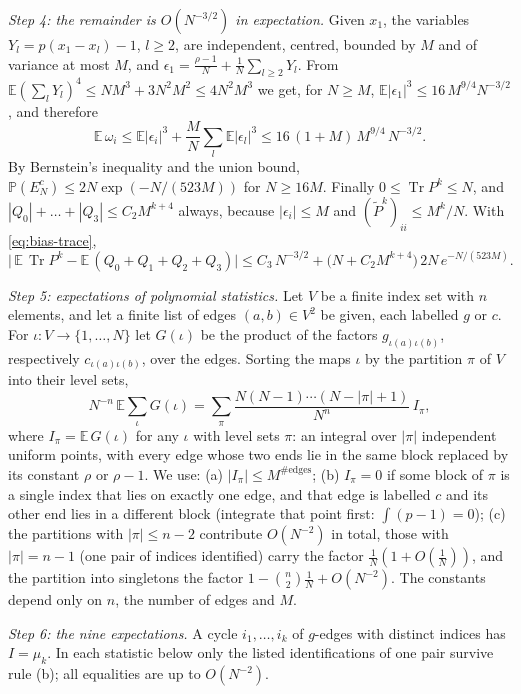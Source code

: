 \documentclass[11pt,a4paper]{article}
\makeatletter
\theoremstyle{stmt}
\theoremstyle{defn}
\theoremstyle{rmk}
\renewenvironment{proof}[1][\proofname]{\par\pushQED{\qed}\normalfont\topsep6\p@\@plus6\p@\relax
  \trivlist\item[\hskip\labelsep{\sffamily\itshape\small #1.}]\ignorespaces}{\popQED\endtrivlist\@endpefalse}
\numberwithin{equation}{section}
\DeclareMathOperator{\Tr}{Tr}
\makeatother
\begin{document}
{\begin{proof}
\emph{Step 4: the remainder is $O(N^{-3/2})$ in expectation.} Given $x_1$, the variables $Y_l=p(x_1-x_l)-1$, $l\ge2$, are independent, centred, bounded by $M$ and of variance at most $M$, and $\epsilon_1=\frac{\rho-1}N+\frac1N\sum_{l\ge2}Y_l$. From $\mathbb E(\sum_lY_l)^4\le NM^3+3N^2M^2\le4N^2M^3$ we get, for $N\ge M$, $\mathbb E|\epsilon_1|^3\le16\,M^{9/4}N^{-3/2}$, and therefore
\[
\mathbb E\,\omega_i\le\mathbb E|\epsilon_i|^3+\frac MN\sum_l\mathbb E|\epsilon_l|^3\le16\,(1+M)\,M^{9/4}\,N^{-3/2}.
\]
By Bernstein's inequality and the union bound, $\mathbb P(E_N^c)\le2N\exp(-N/(523M))$ for $N\ge16M$. Finally $0\le\Tr P^k\le N$, and $|Q_0|+\dots+|Q_3|\le C_2M^{k+4}$ always, because $|\epsilon_i|\le M$ and $(\tilde P^k)_{ii}\le M^k/N$. With \eqref{eq:bias-trace},
\begin{equation}\label{eq:bias-reduce}
\Big|\,\mathbb E\,\Tr P^k-\mathbb E\,(Q_0+Q_1+Q_2+Q_3)\Big|\le C_3\,N^{-3/2}+\big(N+C_2M^{k+4}\big)\,2N\,e^{-N/(523M)} .
\end{equation}

\emph{Step 5: expectations of polynomial statistics.} Let $V$ be a finite index set with $n$ elements, and let a finite list of edges $(a,b)\in V^2$ be given, each labelled $g$ or $c$. For $\iota\colon V\to\{1,\dots,N\}$ let $G(\iota)$ be the product of the factors $g_{\iota(a)\iota(b)}$, respectively $c_{\iota(a)\iota(b)}$, over the edges. Sorting the maps $\iota$ by the partition $\pi$ of $V$ into their level sets,
\begin{equation}\label{eq:bias-diagram}
N^{-n}\,\mathbb E\sum_\iota G(\iota)=\sum_\pi\frac{N(N-1)\cdots(N-|\pi|+1)}{N^n}\,I_\pi ,
\end{equation}
where $I_\pi=\mathbb E\,G(\iota)$ for any $\iota$ with level sets $\pi$: an integral over $|\pi|$ independent uniform points, with every edge whose two ends lie in the same block replaced by its constant $\rho$ or $\rho-1$. We use: (a) $|I_\pi|\le M^{\#\mathrm{edges}}$; (b) $I_\pi=0$ if some block of $\pi$ is a single index that lies on exactly one edge, and that edge is labelled $c$ and its other end lies in a different block (integrate that point first: $\int(p-1)=0$); (c) the partitions with $|\pi|\le n-2$ contribute $O(N^{-2})$ in total, those with $|\pi|=n-1$ (one pair of indices identified) carry the factor $\frac1N(1+O(\frac1N))$, and the partition into singletons the factor $1-\binom n2\frac1N+O(N^{-2})$. The constants depend only on $n$, the number of edges and $M$.

\emph{Step 6: the nine expectations.} A cycle $i_1,\dots,i_k$ of $g$-edges with distinct indices has $I=\mu_k$. In each statistic below only the listed identifications of one pair survive rule (b); all equalities are up to $O(N^{-2})$.


\end{proof}}
\end{document}
